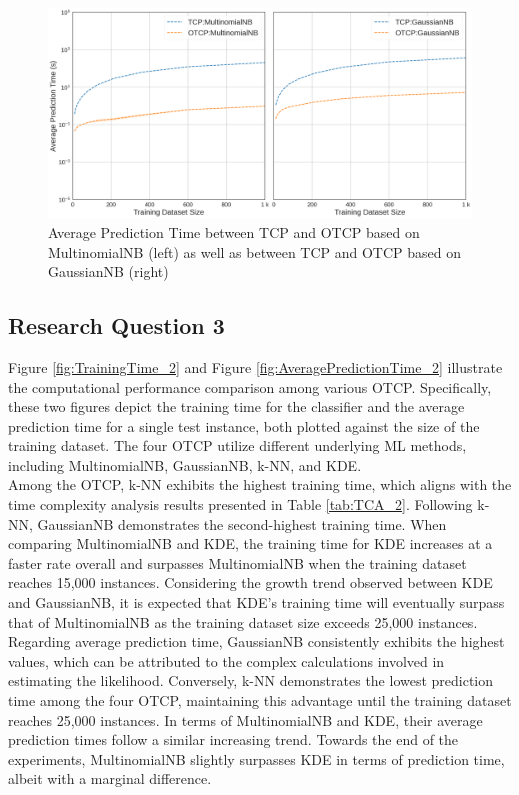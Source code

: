 \documentclass[10pt]{reportMaster}
\begin{document}
\begin{figure}[H]
    \centering
    \includegraphics[width = 13cm]{figures/AveragePredictionTime_1.png}
    \caption{Average Prediction Time between TCP and OTCP based on MultinomialNB (left) as well as between TCP and OTCP based on GaussianNB (right)}
    \label{fig:AveragePredictionTime_1}
\end{figure}


\subsection{Research Question 3}

Figure \ref{fig:TrainingTime_2} and Figure \ref{fig:AveragePredictionTime_2} illustrate the computational performance comparison among various OTCP. Specifically, these two figures depict the training time for the classifier and the average prediction time for a single test instance, both plotted against the size of the training dataset. The four OTCP utilize different underlying ML methods, including MultinomialNB, GaussianNB, k-NN, and KDE.\\

\noindent Among the OTCP, k-NN exhibits the highest training time, which aligns with the time complexity analysis results presented in Table \ref{tab:TCA_2}. Following k-NN, GaussianNB demonstrates the second-highest training time. When comparing MultinomialNB and KDE, the training time for KDE increases at a faster rate overall and surpasses MultinomialNB when the training dataset reaches 15,000 instances. Considering the growth trend observed between KDE and GaussianNB, it is expected that KDE's training time will eventually surpass that of MultinomialNB as the training dataset size exceeds 25,000 instances.\\

\noindent Regarding average prediction time, GaussianNB consistently exhibits the highest values, which can be attributed to the complex calculations involved in estimating the likelihood. Conversely, k-NN demonstrates the lowest prediction time among the four OTCP, maintaining this advantage until the training dataset reaches 25,000 instances. In terms of MultinomialNB and KDE, their average prediction times follow a similar increasing trend. Towards the end of the experiments, MultinomialNB slightly surpasses KDE in terms of prediction time, albeit with a marginal difference.
\end{document}
